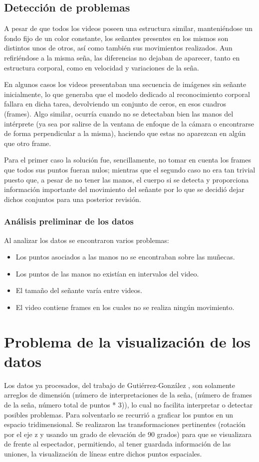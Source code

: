 \subsection{Detección de problemas}
A pesar de que todos los videos poseen una estructura similar, manteniéndose un fondo fijo de un color constante, los señantes presentes en los mismos son distintos unos de otros, así como también sus movimientos realizados. Aun refiriéndose a la misma seña, las diferencias no dejaban de aparecer, tanto en estructura corporal, como en velocidad y variaciones de la seña.

En algunos casos los videos presentaban una secuencia de imágenes sin señante inicialmente, lo que generaba que el modelo dedicado al reconocimiento corporal fallara en dicha tarea, devolviendo un conjunto de ceros, en esos cuadros (frames). Algo similar, ocurría cuando no se detectaban bien las manos del intérprete (ya sea por salirse de la ventana de enfoque de la cámara o encontrarse de forma perpendicular a la misma), haciendo que estas no aparezcan en algún que otro frame.

Para el primer caso la solución fue, sencillamente, no tomar en cuenta los frames que todos sus puntos fueran nulos; mientras que el segundo caso no era tan trivial puesto que, a pesar de no tener las manos, el cuerpo si se detecta y proporciona información importante del movimiento del señante por lo que se decidió dejar dichos conjuntos para una posterior revisión.

\subsubsection{Análisis preliminar de los datos}

Al analizar los datos se encontraron varios problemas:
\begin{itemize}
	\item Los puntos asociados a las manos no se encontraban sobre las muñecas.
	\item Los puntos de las manos no existían en intervalos del video.
	\item El tamaño del señante varía entre videos.
	\item El video contiene frames en los cuales no se realiza ningún movimiento.
\end{itemize}


\section{Problema de la visualización de los datos}
Los datos ya procesados, del trabajo de Gutiérrez-González , son solamente arreglos de dimensión (número de interpretaciones de la seña, (número de frames de la seña,  número total de puntos * 3)), lo cual no facilita  interpretar o detectar posibles problemas. Para solventarlo se recurrió a graficar los puntos en un espacio tridimensional. Se realizaron las transformaciones pertinentes (rotación por el eje z y usando un grado de elevación de 90 grados)  para que se visualizara de frente al espectador, permitiendo, al tener guardada información de las uniones, la visualización de líneas entre dichos puntos espaciales.

